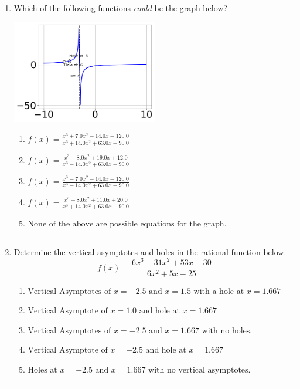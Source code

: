 \documentclass[14pt]{extbook}
\newcommand{\litem}[1]{\item#1\hspace*{-1cm}\rule{\textwidth}{0.4pt}}
\begin{document}
\begin{enumerate}
{\begin{enumerate}[label=\Alph*.]
\end{enumerate} }
\litem{
Which of the following functions \textit{could} be the graph below?
\begin{center}
    \includegraphics[width=0.5\textwidth]{../Figures/identifyGraphOfRationalFunctionCopyC.png}
\end{center}
\begin{enumerate}[label=\Alph*.]
\item \( f(x)=\frac{x^{3} +7.0 x^{2} -14.0 x -120.0}{x^{3} +14.0 x^{2} +63.0 x + 90.0} \)
\item \( f(x)=\frac{x^{3} +8.0 x^{2} +19.0 x + 12.0}{x^{3} -14.0 x^{2} +63.0 x -90.0} \)
\item \( f(x)=\frac{x^{3} -7.0 x^{2} -14.0 x + 120.0}{x^{3} -14.0 x^{2} +63.0 x -90.0} \)
\item \( f(x)=\frac{x^{3} -8.0 x^{2} +11.0 x + 20.0}{x^{3} +14.0 x^{2} +63.0 x + 90.0} \)
\item \( \text{None of the above are possible equations for the graph.} \)

\end{enumerate} }
\litem{
Determine the vertical asymptotes and holes in the rational function below.\[ f(x) = \frac{6x^{3} -31 x^{2} +53 x -30}{6x^{2} +5 x -25} \]\begin{enumerate}[label=\Alph*.]
\item \( \text{Vertical Asymptotes of } x = -2.5 \text{ and } x = 1.5 \text{ with a hole at } x = 1.667 \)
\item \( \text{Vertical Asymptote of } x = 1.0 \text{ and hole at } x = 1.667 \)
\item \( \text{Vertical Asymptotes of } x = -2.5 \text{ and } x = 1.667 \text{ with no holes.} \)
\item \( \text{Vertical Asymptote of } x = -2.5 \text{ and hole at } x = 1.667 \)
\item \( \text{Holes at } x = -2.5 \text{ and } x = 1.667 \text{ with no vertical asymptotes.} \)


\end{enumerate}}
\end{enumerate}
\end{document}
